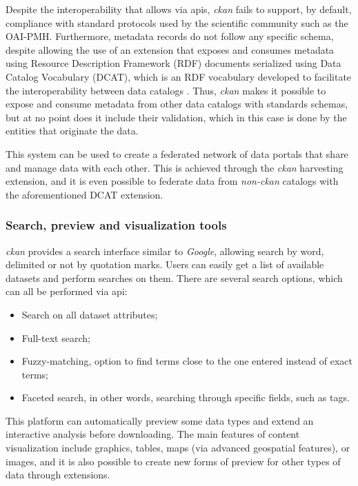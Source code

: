 Despite the interoperability that allows via \gls{api}s, \textit{\gls{ckan}} fails to support, by default, compliance with standard protocols used by the scientific community such as the OAI-PMH. Furthermore, metadata records do not follow any specific schema, despite allowing the use of an extension that exposes and consumes metadata using Resource Description Framework (RDF) documents serialized using Data Catalog Vocabulary (DCAT), which is an RDF vocabulary developed to facilitate the interoperability between data catalogs \citep{4, 5}. Thus, \textit{\gls{ckan}} makes it possible to expose and consume metadata from other data catalogs with standards schemas, but at no point does it include their validation, which in this case is done by the entities that originate the data.
 
This system can be used to create a federated network of data portals that share and manage data with each other. This is achieved through the \textit{\gls{ckan}} harvesting extension, and it is even possible to federate data from \textit{non-\gls{ckan}} catalogs with the aforementioned DCAT extension.
  
\subsubsection{Search, preview and visualization tools}
  
\textit{\gls{ckan}} provides a search interface similar to \textit{Google}, allowing search by word, delimited or not by quotation marks. Users can easily get a list of available datasets and perform searches on them. There are several search options, which can all be performed via \gls{api}:
  
\begin{itemize}
  \item Search on all dataset attributes;
  \item Full-text search;
  \item Fuzzy-matching, option to find terms close to the one entered instead of exact terms;
  \item Faceted search, in other words, searching through specific fields, such as tags.
\end{itemize}
  
This platform can automatically preview some data types and extend an interactive analysis before downloading. The main features of content visualization include graphics, tables, maps (via advanced geospatial features), or images, and it is also possible to create new forms of preview for other types of data through extensions.
  
